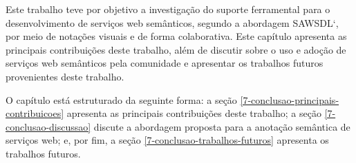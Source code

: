 Este trabalho teve por objetivo a investigação do suporte ferramental para o desenvolvimento de serviços web semânticos, segundo a abordagem SAWSDL`\cite{W3C-2007-SAWSDL}, por meio de notações visuais e de forma colaborativa. Este capítulo apresenta as principais contribuições deste trabalho, além de discutir sobre o uso e adoção de serviços web semânticos pela comunidade e apresentar os trabalhos futuros provenientes deste trabalho.

O capítulo está estruturado da seguinte forma: a seção \ref{7-conclusao-principais-contribuicoes} apresenta as principais contribuições deste trabalho; a seção \ref{7-conclusao-discussao} discute a abordagem proposta para a anotação semântica de serviços web; e, por fim, a seção \ref{7-conclusao-trabalhos-futuros} apresenta os trabalhos futuros.